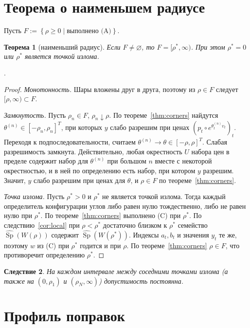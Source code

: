 \documentclass[a4paper,11pt]{article}
\newcommand{\lean}[1]{\mbox{\path{#1}}} %
\theoremstyle{plain}
\newtheorem{theorem}{Теорема}[section]
\newtheorem{corollary}[theorem]{Следствие}
\theoremstyle{definition}
\theoremstyle{remark}
\newcommand{\set}[1]{\left\{ #1 \right\}}
\DeclareMathOperator{\Sp}{Sp}
\begin{document}
\section{Теорема о наименьшем радиусе}

Пусть $F:=\set{\rho\ge0\mid\text{выполнено (A)}}$.

\begin{theorem}[наименьший радиус]\label{thm:least}
    Если $F\ne\varnothing$, то $F=[\rho^*,\infty)$. При этом $\rho^*=0$ или $\rho^*$ является точкой излома.
\end{theorem}

\lean{least_wradius_breakpoint}.

\begin{proof}
    \emph{Монотонность.} Шары вложены друг в друга, поэтому из $\rho\in F$ следует $[\rho,\infty)\subset F$.

    \emph{Замкнутость.} Пусть $\rho_n\in F$, $\rho_n\downarrow\rho$. По теореме~\ref{thm:corners} найдутся $\theta^{(n)}\in[-\rho_n,\rho_n]^T$, при которых $y$ слабо разрешим при ценах $(p_t\circ e^{\theta^{(n)}_tv_t})_t$. Переходя к подпоследовательности, считаем $\theta^{(n)}\to\theta\in[-\rho,\rho]^T$. Слабая разрешимость замкнута. Действительно, любая окрестность $U$ набора цен в пределе содержит набор для $\theta^{(n)}$ при большом $n$ вместе с некоторой окрестностью, и в ней по определению есть набор, при котором $y$ разрешим. Значит, $y$ слабо разрешим при ценах для $\theta$, и $\rho\in F$ по теореме~\ref{thm:corners}.

    \emph{Точка излома.} Пусть $\rho^*>0$ и $\rho^*$ не является точкой излома. Тогда каждый определитель конфигурации углов либо равен нулю тождественно, либо не равен нулю при $\rho^*$. По теореме~\ref{thm:corners} выполнено (C) при $\rho^*$. По следствию~\ref{cor:local} при $\rho<\rho^*$ достаточно близком к $\rho^*$ семейство $\widehat{\Sp}(W(\rho))$ содержит $\widehat{\Sp}(W(\rho^*))$. Индексы $a_t,b_t$ и значения $y_t$ те же, поэтому $w$ из (C) при $\rho^*$ годится и при $\rho$. По теореме~\ref{thm:corners} $\rho\in F$, что противоречит определению $\rho^*$.
\end{proof}

\begin{corollary}\label{cor:gap}
    На каждом интервале между соседними точками излома (а также на $(0,\rho_1)$ и $(\rho_N,\infty)$) допустимость постоянна.
\end{corollary}

\section{Профиль поправок}\label{sec:profile}
\end{document}
